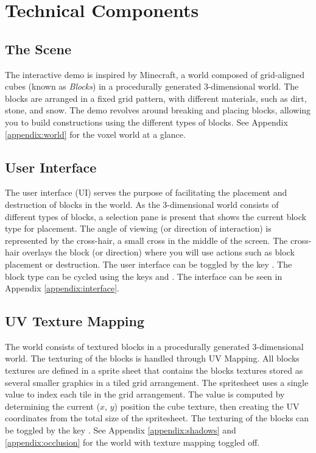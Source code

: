 \documentclass[a4paper,11pt,titlepage]{scrartcl}
\begin{document}
\section{Technical Components}
\subsection{The Scene}
\label{section:scene}
The interactive demo is inspired by Minecraft, a world composed of grid-aligned cubes (known as \textit{Blocks}) in a procedurally generated 3-dimensional world. The blocks are arranged in a fixed grid pattern, with different materials, such as dirt, stone, and snow. The demo revolves around breaking and placing blocks, allowing you to build constructions using the different types of blocks.
\vskip 2.5mm\noindent
See Appendix \ref{appendix:world} for the voxel world at a glance.
  
\subsection{User Interface}
\label{section:interface}
The user interface (UI) serves the purpose of facilitating the placement and destruction of blocks in the world. As the 3-dimensional world consists of different types of blocks, a selection pane is present that shows the current block type for placement. The angle of viewing (or direction of interaction) is represented by the cross-hair, a small cross in the middle of the screen. The cross-hair overlays the block (or direction) where you will use actions such as block placement or destruction.
\vskip 2.5mm\noindent
The user interface can be toggled by the key . The block type can be cycled using the keys  and . The interface can be seen in Appendix \ref{appendix:interface}. 

\subsection{UV Texture Mapping}
\label{section:texture}
The world consists of textured blocks in a procedurally generated 3-dimensional world. The texturing of the blocks is handled through UV Mapping. All blocks textures are defined in a sprite sheet that contains the blocks textures stored as several smaller graphics in a tiled grid arrangement. The spritesheet uses a single value to index each tile in the grid arrangement. The value is computed by determining the current ($x$, $y$) position the cube texture, then creating the UV coordinates from the total size of the spritesheet.
\vskip 2.5mm\noindent
The texturing of the blocks can be toggled by the key . See Appendix \ref{appendix:shadows} and \ref{appendix:occlusion} for the world with texture mapping toggled off.
\end{document}
